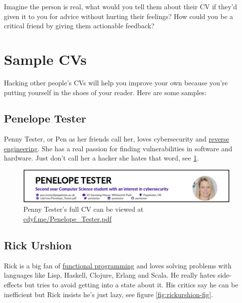 \documentclass[
]{book}
\begin{document}
Imagine the person is real, what would you tell them about their CV if they'd given it to you for advice without hurting their feelings? How could you be a critical friend by giving them actionable feedback?

\hypertarget{sample-cvs}{%
\section{Sample CVs}\label{sample-cvs}}

Hacking other people's CVs will help you improve your own because you're putting yourself in the shoes of your reader. Here are some samples:

\hypertarget{pen-tester}{%
\subsection{Penelope Tester}\label{pen-tester}}

Penny Tester, or Pen as her friends call her, loves cybersecurity and \href{https://en.wikipedia.org/wiki/Reverse_engineering}{reverse engineering}. She has a real passion for finding vulnerabilities in software and hardware. Just don't call her a hacker she hates that word, see \ref{fig:pentester-fig}.

\begin{figure}

{\centering \includegraphics[width=1\linewidth]{images/pen_tester} 

}

\caption{Penny Tester's full CV can be viewed at \href{https://www.cdyf.me/Penelope_Tester.pdf}{cdyf.me/Penelope\_Tester.pdf}}\label{fig:pentester-fig}
\end{figure}



\hypertarget{rick-urshion}{%
\subsection{Rick Urshion}\label{rick-urshion}}

Rick is a big fan of \href{https://en.wikipedia.org/wiki/Functional_programming}{functional programming} and loves solving problems with languages like Lisp, Haskell, Clojure, Erlang and Scala. He really hates side-effects but tries to avoid getting into a state about it. His critics say he can be inefficient but Rick insists he's just lazy, see figure \ref{fig:rickurshion-fig}.
\end{document}
